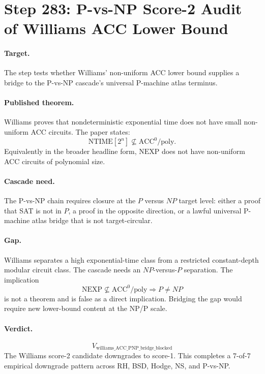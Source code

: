 \section*{Step 283: P-vs-NP Score-2 Audit of Williams ACC Lower Bound}

\paragraph{Target.}
The step tests whether Williams' non-uniform ACC lower bound supplies a bridge to the P-vs-NP cascade's universal P-machine atlas terminus.

\paragraph{Published theorem.}
Williams proves that nondeterministic exponential time does not have small non-uniform ACC circuits.  The paper states:
\[
  \mathrm{NTIME}[2^n] \not\subseteq \mathrm{ACC}^0/\mathrm{poly}.
\]
Equivalently in the broader headline form, \( \mathrm{NEXP} \) does not have non-uniform ACC circuits of polynomial size.

\paragraph{Cascade need.}
The P-vs-NP chain requires closure at the \(P\) versus \(NP\) target level: either a proof that SAT is not in \(P\), a proof in the opposite direction, or a lawful universal P-machine atlas bridge that is not target-circular.

\paragraph{Gap.}
Williams separates a high exponential-time class from a restricted constant-depth modular circuit class.  The cascade needs an \(NP\)-versus-\(P\) separation.  The implication
\[
  \mathrm{NEXP}\not\subseteq \mathrm{ACC}^0/\mathrm{poly}
  \Rightarrow P\ne NP
\]
is not a theorem and is false as a direct implication.  Bridging the gap would require new lower-bound content at the NP/P scale.

\paragraph{Verdict.}
\[
  \boxed{V_{\mathrm{williams\_ACC\_PNP\_bridge\_blocked}}}
\]
The Williams score-2 candidate downgrades to score-1.  This completes a 7-of-7 empirical downgrade pattern across RH, BSD, Hodge, NS, and P-vs-NP.

